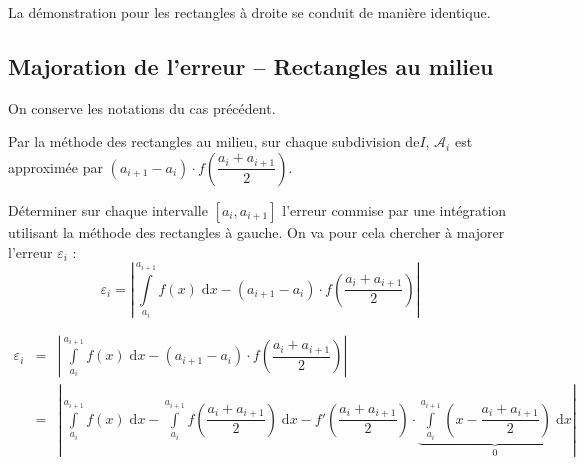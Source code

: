 \documentclass[10pt,fleqn]{article} %
\begin{document}
\begin{rem}
La démonstration pour les rectangles à droite se conduit de manière identique. 
\end{rem}

\subsection{Majoration de l'erreur -- Rectangles au milieu}
On conserve les notations du cas précédent.

 Par la méthode des rectangles au milieu, sur chaque subdivision de$I$, $\mathcal{A}_i$ est approximée par $\left(a_{i+1}-a_{i}\right) \cdot f\left(\dfrac{a_i+a_{i+1}}{2}\right) $. 

\begin{obj}
Déterminer sur chaque intervalle $[a_i,a_{i+1}]$ l'erreur commise par une intégration utilisant la méthode des rectangles à gauche. On va pour cela chercher à majorer l'erreur $\varepsilon_i$ :
$$
\varepsilon_i = \left| \int\limits_{a_i}^{a_{i+1}}f(x)\;\mathrm{d}x -
\left(a_{i+1}-a_{i}\right) \cdot f\left(\dfrac{a_i+a_{i+1}}{2}\right)\right|
$$
\end{obj}

\begin{eqnarray*}
\varepsilon_i & = &\left| \int\limits_{a_i}^{a_{i+1}}f(x)\;\mathrm{d}x -
\left(a_{i+1}-a_{i}\right) \cdot f\left(\dfrac{a_i+a_{i+1}}{2}\right)\right| \\
 & = &  \left|\int\limits_{a_i}^{a_{i+1}}f(x)\;\mathrm{d}x 
 - \int\limits_{a_i}^{a_{i+1}}f\left(\dfrac{a_i+a_{i+1}}{2}\right)\;\mathrm{d}x 
 - f'\left(\dfrac{a_i+a_{i+1}}{2}\right) 
 \cdot \underbrace{\int\limits_{a_i}^{a_{i+1}} \left( x - \dfrac{a_i+a_{i+1}}{2}\right)\;\mathrm{d}x}_{0} \right|\\%
\end{eqnarray*}
\end{document}
